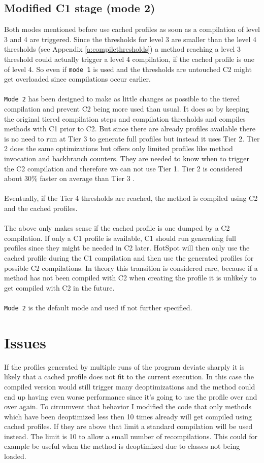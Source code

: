 \subsection{Modified C1 stage (mode 2)}
\label{s:mode2}
Both modes mentioned before use cached profiles as soon as a compilation of level 3 and 4 are triggered. Since the thresholds for level 3 are smaller than the level 4 thresholds (see Appendix \ref{a:compilethresholds}) a method reaching a level 3 threshold could actually trigger a level 4 compilation, if the cached profile is one of level 4. So even if \texttt{mode 1} is used and the thresholds are untouched C2 might get overloaded since compilations occur earlier.
\\\\
\texttt{Mode 2} has been designed to make as little changes as possible to the tiered compilation and prevent C2 being more used than usual. It does so by keeping the original tiered compilation steps and compilation thresholds and compiles methods with C1 prior to C2. But since there are already profiles available there is no need to run at Tier 3 to generate full profiles but instead it uses Tier 2.
Tier 2 does the same optimizations but offers only limited profiles like method invocation and backbranch counters. They are needed to know when to trigger the C2 compilation and therefore we can not use Tier 1. Tier 2 is considered about 30\% faster on average than Tier 3 \cite{code_atp_hpp}.
\\\\
Eventually, if the Tier 4 thresholds are reached, the method is compiled using C2 and the cached profiles.
\\\\
The above only makes sense if the cached profile is one dumped by a C2 compilation.
If only a C1 profile is available, C1 should run generating full profiles since they might be needed in C2 later. HotSpot will then only use the cached profile during the C1 compilation and then use the generated profiles for possible C2 compilations.
In theory this transition is considered rare, because if a method has not been compiled with C2 when creating the profile it is unlikely to get compiled with C2 in the future.
\\\\
\texttt{Mode 2} is the default mode and used if not further specified.

\section{Issues}
\label{s:issues}
If the profiles generated by multiple runs of the program deviate sharply it is likely that a cached profile does not fit to the current execution. In this case the compiled version would still trigger many deoptimizations and the method could end up having even worse performance since it's going to use the profile over and over again.
To circumvent that behavior I modified the code that only methods which have been deoptimized less then 10 times already will get compiled using cached profiles. If they are above that limit a standard compilation will be used instead.
The limit is 10 to allow a small number of recompilations. This could for example be useful when the method is deoptimized due to classes not being loaded. 
